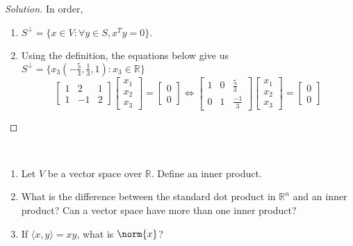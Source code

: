 \documentclass[crop=false,class=book,oneside]{standalone}
\begin{document}
        \begin{proof}[Solution]
        In order,
        \begin{enumerate}
            \item $S^{\perp} = \{x\in V: \forall y\in S, x^T y = 0\}$.
            \item Using the definition, the equations below give us $S^{\perp}=\{x_{3}(-\frac{5}{3},\frac{1}{3},1):x_{3}\in \mathbb{R}\}$
            \begin{equation*}
                \begin{bmatrix}1&2&1\\1&-1&2\end{bmatrix}\begin{bmatrix}x_1\\x_2\\x_3\end{bmatrix}=\begin{bmatrix}0\\0\end{bmatrix}\Leftrightarrow\begin{bmatrix}1&0&\frac{5}{3} \\0&1&\frac{-1}{3}\end{bmatrix}\begin{bmatrix}x_1\\x_2\\x_3\end{bmatrix}=\begin{bmatrix}0\\0\end{bmatrix}
            \end{equation*}
        \end{enumerate}
        \end{proof}
        \begin{problem}
        \
        \begin{enumerate}
            \item Let $V$ be a vector space over $\mathbb{R}$. Define an inner product.
            \item What is the difference between the standard dot product in $\mathbb{R}^n$ and an inner product? Can a vector space have more than one inner product?
            \item If $\langle x,y \rangle = xy$, what is $\norm{x}$?
        \end{enumerate}
        \end{problem}
\end{document}
